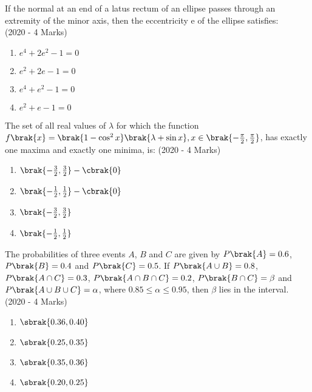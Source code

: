 \iffalse
  \title{Assignment 1}
  \author{Siddhanth Yellanki - ee24btech11059}
  \section{mcq-single}
\fi

    \item{
          	If the normal at an end of a latus rectum of an ellipse passes through an extremity of the minor axis, then the eccentricity e of the ellipse satisfies: \\ \text{  }\hfill
                {(2020 - 4 Marks)}
            \begin{multicols}{2}
				\begin{enumerate}
					\item $e^4+2e^2 - 1 = 0$
					\item $e^2+2e - 1 = 0$
					\item $e^4+e^2 - 1 = 0$
					\item $e^2+e - 1 = 0$
				\end{enumerate}
			\end{multicols}
            }
    \item{
            The set of all real values of $\lambda$ for which the function $f\brak{x} = \brak{1- \cos^2 x}\brak{\lambda+\sin x} , x\in\brak{-\frac{\pi}{2}, \frac{\pi}{2}}$, has exactly one maxima and exactly one minima, is:\hfill
                {(2020 - 4 Marks)}
            \begin{multicols}{2}
                \begin{enumerate}
                    \item $\brak{-\frac{3}{2}, \frac{3}{2}}-\cbrak{0}$
                    \item $\brak{-\frac{1}{2}, \frac{1}{2}}-\cbrak{0}$
                    \item $\brak{-\frac{3}{2}, \frac{3}{2}}$
                    \item $\brak{-\frac{1}{2}, \frac{1}{2}}$
                \end{enumerate}
            \end{multicols}
        }
\item{
        	
        	The probabilities of three events $A$, $B$ and $C$ are given by $P\brak{A} = 0.6$, $P\brak{B} = 0.4$ and $P\brak{C} = 0.5$. If $P\brak{A \cup B} = 0.8$, $P\brak{A \cap C} = 0.3$, $P\brak{A \cap B \cap C} = 0.2$, $P\brak{B \cap C} = \beta$ and $P\brak{A \cup B \cup C} = \alpha$, where $0.85 \leq \alpha \leq 0.95$, then $\beta$ lies in the interval. \\
        	\hfill
        	{(2020 - 4 Marks)}
        	\begin{multicols}{4}
        		\begin{enumerate}
        			\item $\sbrak{0.36,0.40}$
        			\item $\sbrak{0.25,0.35}$
        			\item $\sbrak{0.35,0.36}$
        			\item $\sbrak{0.20,0.25}$
        		\end{enumerate}
        	\end{multicols}
        	
        }
